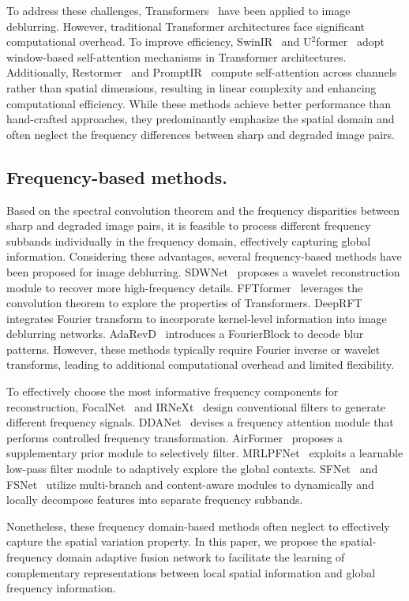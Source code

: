 To address these challenges, Transformers~\cite{2017Attention} have been applied to image deblurring. However, traditional Transformer architectures face significant computational overhead.
To improve efficiency, SwinIR~\cite{liang2021swinir} and U$^2$former~\cite{u2former} adopt window-based self-attention mechanisms in Transformer architectures. Additionally, Restormer~\cite{Zamir2021Restormer} and PromptIR~\cite{potlapalli2023promptir} compute self-attention across channels rather than spatial dimensions, resulting in linear complexity and enhancing computational efficiency.
While these methods achieve better performance than  hand-crafted approaches, they predominantly emphasize the spatial domain and often neglect the frequency differences between sharp and degraded image pairs. 


\subsection{Frequency-based methods.}
Based on the spectral convolution theorem and the frequency disparities between sharp and degraded image pairs, it is feasible to process different frequency subbands individually in the frequency domain, effectively capturing global information.  Considering these advantages, several frequency-based methods have been proposed for image deblurring.
SDWNet~\cite{SDWNet} proposes a wavelet reconstruction module to recover more high-frequency details. FFTformer~\cite{kong2023efficient} leverages the convolution theorem to explore the properties of Transformers. DeepRFT~\cite{fxint2023freqsel} integrates Fourier transform to incorporate kernel-level information into image deblurring networks. AdaRevD~\cite{AdaRevD} introduces a FourierBlock to decode blur patterns. However, these methods typically require Fourier inverse or wavelet transforms, leading to additional computational overhead and limited flexibility.


To effectively choose the most informative frequency components for reconstruction, FocalNet~\cite{focalnetcui2023focal} and IRNeXt~\cite{IRNeXt} design conventional filters to generate different frequency signals. DDANet~\cite{DDAnet} devises a frequency attention module that performs controlled frequency transformation. AirFormer~\cite{10196308} proposes a supplementary prior module to selectively filter. MRLPFNet~\cite{MRLPFNet} exploits a learnable low-pass filter module to adaptively explore the global contexts.
SFNet~\cite{SFNet} and FSNet~\cite{FSNet} utilize multi-branch and content-aware modules to dynamically and locally decompose features into separate frequency subbands.

Nonetheless, these frequency domain-based methods often neglect to effectively capture the spatial variation property.  In this paper, we propose the spatial-frequency domain adaptive fusion network to  facilitate the learning of complementary representations between local spatial information and global frequency information.